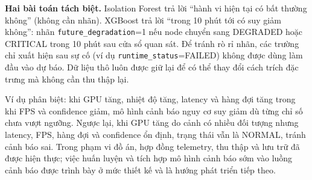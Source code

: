 \textbf{Hai bài toán tách biệt.} Isolation Forest trả lời ``hành vi hiện tại có bất
thường không'' (không cần nhãn). XGBoost trả lời ``trong 10 phút tới có suy giảm
không'': nhãn \texttt{future\_degradation}=1 nếu node chuyển sang DEGRADED hoặc
CRITICAL trong 10 phút sau cửa sổ quan sát. Để tránh rò rỉ nhãn, các trường chỉ
xuất hiện sau sự cố (ví dụ \texttt{runtime\_status}=FAILED) không được dùng làm
đầu vào dự báo. Dữ liệu thô luôn được giữ lại để có thể thay đổi cách trích đặc
trưng mà không cần thu thập lại.

Ví dụ phân biệt: khi GPU tăng, nhiệt độ tăng, latency và hàng đợi tăng trong khi
FPS và confidence giảm, mô hình cảnh báo nguy cơ suy giảm dù từng chỉ số chưa
vượt ngưỡng. Ngược lại, khi GPU tăng do cảnh có nhiều đối tượng nhưng latency,
FPS, hàng đợi và confidence ổn định, trạng thái vẫn là NORMAL, tránh cảnh báo sai.
Trong phạm vi đồ án, hợp đồng telemetry, thu thập và lưu trữ đã được hiện thực;
việc huấn luyện và tích hợp mô hình cảnh báo sớm vào luồng cảnh báo được trình
bày ở mức thiết kế và là hướng phát triển tiếp theo.
